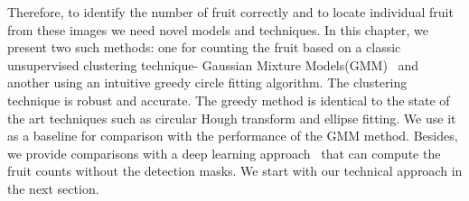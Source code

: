 Therefore, to identify the number of fruit correctly and to locate individual fruit from these images we need novel models and techniques. In this chapter, we present two such methods: one for counting the fruit based on a classic unsupervised clustering technique- Gaussian Mixture Models(GMM)~\cite{em} and another using an intuitive greedy circle fitting algorithm. The clustering technique is robust and accurate. The greedy method is identical to the state of the art techniques such as circular Hough transform and ellipse fitting. We use it as a baseline for comparison with the performance of the GMM method. Besides, we provide comparisons with a deep learning approach~\cite{hani_apple_2018,hani_jfr_counting} that can compute the fruit counts without the detection masks. We start with our technical approach in the next section.

